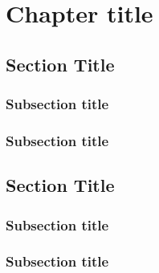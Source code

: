 \chapter{Chapter title}

\section{Section Title}

\subsection{Subsection title}
\subsection{Subsection title}

\section{Section Title}

\subsection{Subsection title}
\subsection{Subsection title}